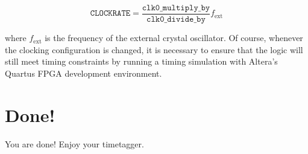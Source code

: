 \[ \mathtt{CLOCKRATE} = \frac{\mathtt{clk0\_multiply\_by}}{\mathtt{clk0\_divide\_by}} f_\mathrm{ext} \]

where $f_\mathrm{ext}$ is the frequency of the external crystal
oscillator. Of course, whenever the clocking configuration is changed,
it is necessary to ensure that the logic will still meet timing
constraints by running a timing simulation with Altera's Quartus FPGA
development environment.

\section{Done!}
You are done! Enjoy your timetagger.

\begin{comment}
\begin{figure}
  \center
  \texttt{[image: T.jpeg]}
  \caption{T the turtle says ``Hello!''.}
  \label{fig:T}
\end{figure}
\end{comment}

